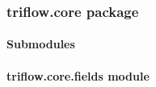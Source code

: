 \documentclass[letterpaper,10pt,english]{sphinxmanual}
\begin{document}
\subsubsection{triflow.core package}
\label{\detokenize{triflow.core:triflow-core-package}}\label{\detokenize{triflow.core::doc}}

\paragraph{Submodules}
\label{\detokenize{triflow.core:submodules}}

\paragraph{triflow.core.fields module}
\label{\detokenize{triflow.core:module-triflow.core.fields}}\label{\detokenize{triflow.core:triflow-core-fields-module}}
\end{document}
